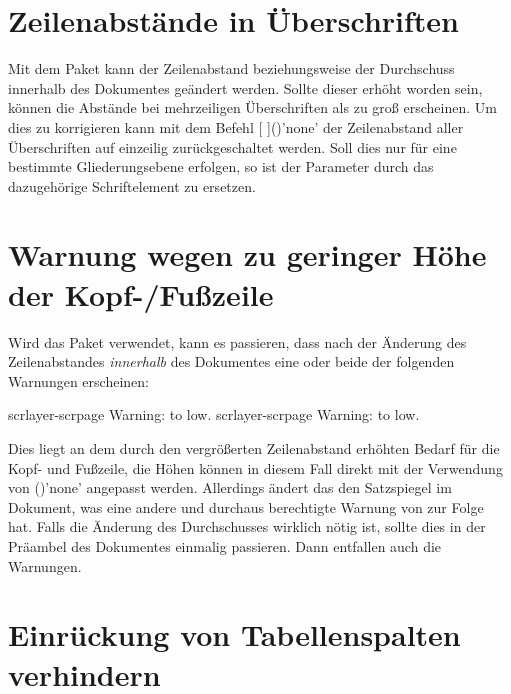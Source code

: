 \section{%
  Zeilenabstände in Überschriften%
  \label{sec:tips:headings}%
}

Mit dem Paket  kann der Zeilenabstand beziehungsweise der 
Durchschuss innerhalb des Dokumentes geändert werden. Sollte dieser erhöht 
worden sein, können die Abstände bei mehrzeiligen Überschriften als zu groß 
erscheinen. Um dies zu korrigieren kann mit dem Befehl 
[%
]()'none'
der Zeilenabstand aller Überschriften auf einzeilig zurückgeschaltet werden. 
Soll dies nur für eine bestimmte Gliederungsebene erfolgen, so ist der 
Parameter  durch das dazugehörige Schriftelement zu 
ersetzen.



\section{%
  Warnung wegen zu geringer Höhe der Kopf-/Fußzeile%
  \label{sec:tips:headline}%
}

Wird das Paket  verwendet, kann es passieren, dass nach der 
Änderung des Zeilenabstandes \emph{innerhalb} des Dokumentes eine oder beide 
der folgenden Warnungen erscheinen:
%
\begin{quoting}
\begin{Code}
scrlayer-scrpage Warning: \headheight to low.
scrlayer-scrpage Warning: \footheight to low.
\end{Code}
\end{quoting}
%
Dies liegt an dem durch den vergrößerten Zeilenabstand erhöhten Bedarf für die
Kopf- und Fußzeile, die Höhen können in diesem Fall direkt mit der Verwendung 
von ()'none' angepasst werden. 
Allerdings ändert das den Satzspiegel im Dokument, was eine andere und durchaus 
berechtigte Warnung von  zur Folge hat. Falls die Änderung 
des Durchschusses wirklich nötig ist, sollte dies in der Präambel des 
Dokumentes einmalig passieren. Dann entfallen auch die Warnungen.



\section{%
  Einrückung von Tabellenspalten verhindern%
  \label{sec:tips:table}%
}

